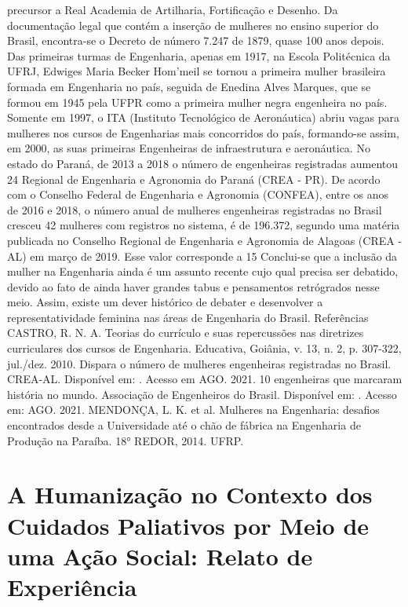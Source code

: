 precursor a Real Academia de Artilharia, Fortificação e Desenho. Da documentação legal que
contém a inserção de mulheres no ensino superior do Brasil, encontra-se o Decreto de número
7.247 de 1879, quase 100 anos depois.
Das primeiras turmas de Engenharia, apenas em 1917, na Escola Politécnica da UFRJ,
Edwiges Maria Becker Hom’meil se tornou a primeira mulher brasileira formada em Engenharia
no país, seguida de Enedina Alves Marques, que se formou em 1945 pela UFPR como a primeira
mulher negra engenheira no país. Somente em 1997, o ITA (Instituto Tecnológico de
Aeronáutica) abriu vagas para mulheres nos cursos de Engenharias mais concorridos do país,
formando-se assim, em 2000, as suas primeiras Engenheiras de infraestrutura e aeronáutica.
No estado do Paraná, de 2013 a 2018 o número de engenheiras registradas aumentou
24%
Regional de Engenharia e Agronomia do Paraná (CREA - PR). De acordo com o Conselho
Federal de Engenharia e Agronomia (CONFEA), entre os anos de 2016 e 2018, o número anual
de mulheres engenheiras registradas no Brasil cresceu 42%
mulheres com registros no sistema, é de 196.372, segundo uma matéria publicada no Conselho
Regional de Engenharia e Agronomia de Alagoas (CREA - AL) em março de 2019. Esse valor
corresponde a 15%
Conclui-se que a inclusão da mulher na Engenharia ainda é um assunto recente cujo qual
precisa ser debatido, devido ao fato de ainda haver grandes tabus e pensamentos retrógrados
nesse meio. Assim, existe um dever histórico de debater e desenvolver a representatividade
feminina nas áreas de Engenharia do Brasil.
Referências
CASTRO, R. N. A. Teorias do currículo e suas repercussões nas diretrizes curriculares dos
cursos de Engenharia. Educativa, Goiânia, v. 13, n. 2, p. 307-322, jul./dez. 2010.
Dispara o número de mulheres engenheiras registradas no Brasil. CREA-AL. Disponível em:
.
Acesso em AGO. 2021.
10 engenheiras que marcaram história no mundo. Associação de Engenheiros do Brasil.
Disponível em:
. Acesso em:
AGO. 2021.
MENDONÇA, L. K. et al. Mulheres na Engenharia: desafios encontrados desde a
Universidade até o chão de fábrica na Engenharia de Produção na Paraíba. 18° REDOR,
2014. UFRP.



\section{A Humanização no Contexto dos Cuidados Paliativos por Meio de uma Ação Social: Relato de Experiência}

